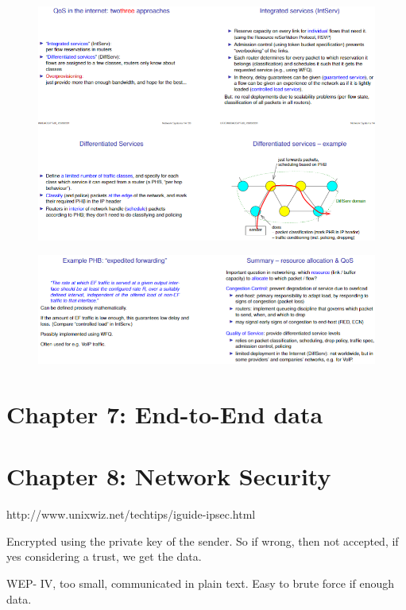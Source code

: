 \documentclass[12pt]{book}
\begin{document}
\begin{figure}[H]
    \centering
    \includegraphics[width = \textwidth]{Pictures/IntServDiffServ.png}
\end{figure}

\begin{figure}[H]
    \centering
    \includegraphics[width = \textwidth]{Pictures/IntServDiffServ2.png}
\end{figure}

\chapter{Chapter 7: End-to-End data}


\chapter{Chapter 8: Network Security}
http://www.unixwiz.net/techtips/iguide-ipsec.html

Encrypted using the private key of the sender. So if wrong, then not accepted, if yes considering a trust, we get the data.

WEP- IV, too small, communicated in plain text. Easy to brute force if enough data.
\end{document}
